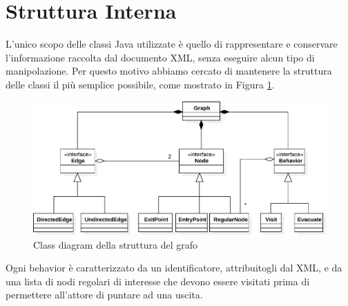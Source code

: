\section{Struttura Interna}
L'unico scopo delle classi Java utilizzate è quello di rappresentare e conservare l'informazione raccolta dal documento XML, senza eseguire alcun tipo di manipolazione. Per questo motivo abbiamo cercato di mantenere la struttura delle classi il più semplice possibile, come mostrato in Figura \ref{fig:graph-diagram}.\\
\begin{figure}[htbp]
\centering
\includegraphics[width=\textwidth,height=\textheight,keepaspectratio]{images/graph-diagram.pdf}
\caption{Class diagram della struttura del grafo}
\label{fig:graph-diagram}
\end{figure}
Ogni behavior è caratterizzato da un identificatore, attribuitogli dal XML, e da una lista di nodi regolari di interesse che devono essere visitati prima di permettere all'attore di puntare ad una uscita. 

